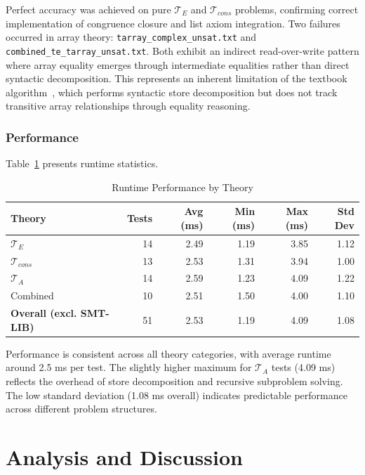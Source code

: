 \documentclass[11pt,a4paper]{article}
\begin{document}
Perfect accuracy was achieved on pure $\mathcal{T}_E$ and $\mathcal{T}_{cons}$ problems, confirming correct implementation of congruence closure and list axiom integration. Two failures occurred in array theory: \texttt{tarray\_complex\_unsat.txt} and \texttt{combined\_te\_tarray\_unsat.txt}. Both exhibit an indirect read-over-write pattern where array equality emerges through intermediate equalities rather than direct syntactic decomposition. This represents an inherent limitation of the textbook algorithm~\cite{bradley2007calculus}, which performs syntactic store decomposition but does not track transitive array relationships through equality reasoning.

\subsubsection{Performance}

Table~\ref{tab:performance} presents runtime statistics.

\begin{table}[h]
\centering
\caption{Runtime Performance by Theory}
\label{tab:performance}
\begin{tabular}{@{}lrrrrr@{}}
\toprule
\textbf{Theory} & \textbf{Tests} & \textbf{Avg (ms)} & \textbf{Min (ms)} & \textbf{Max (ms)} & \textbf{Std Dev} \\
\midrule
$\mathcal{T}_E$ & 14 & 2.49 & 1.19 & 3.85 & 1.12 \\
$\mathcal{T}_{cons}$ & 13 & 2.53 & 1.31 & 3.94 & 1.00 \\
$\mathcal{T}_A$ & 14 & 2.59 & 1.23 & 4.09 & 1.22 \\
Combined & 10 & 2.51 & 1.50 & 4.00 & 1.10 \\
\midrule
\textbf{Overall (excl. SMT-LIB)} & 51 & 2.53 & 1.19 & 4.09 & 1.08 \\
\bottomrule
\end{tabular}
\end{table}

Performance is consistent across all theory categories, with average runtime around 2.5 ms per test. The slightly higher maximum for $\mathcal{T}_A$ tests (4.09 ms) reflects the overhead of store decomposition and recursive subproblem solving. The low standard deviation (1.08 ms overall) indicates predictable performance across different problem structures.

\section{Analysis and Discussion}
\end{document}

